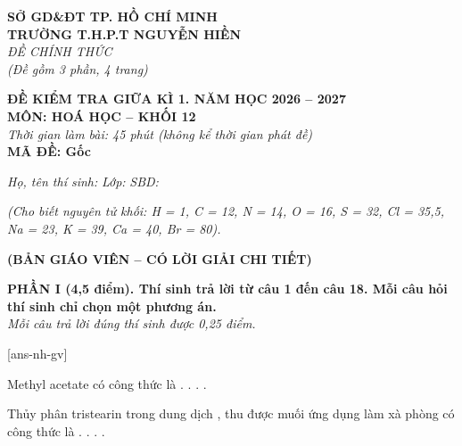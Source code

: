 \documentclass[11pt,a4paper]{article}
\begin{document}
\begin{minipage}[t]{0.45\textwidth}
\textbf{SỞ GD\&ĐT TP. HỒ CHÍ MINH}\\
\textbf{TRƯỜNG T.H.P.T NGUYỄN HIỀN}\\
\textit{ĐỀ CHÍNH THỨC}\\
\textit{(Đề gồm 3 phần, 4 trang)}
\end{minipage}
\hfill
\begin{minipage}[t]{0.52\textwidth}
\raggedleft
\textbf{\color{hfRed}ĐỀ KIỂM TRA GIỮA KÌ 1. NĂM HỌC 2026 -- 2027}\\
\textbf{MÔN: HOÁ HỌC -- KHỐI 12}\\
\textit{Thời gian làm bài: 45 phút (không kể thời gian phát đề)}\\
\textbf{MÃ ĐỀ: Gốc}
\end{minipage}

\vspace{3pt}
\noindent
\textit{Họ, tên thí sinh:} \dotfill \textit{Lớp:} \dotfill \textit{SBD:} \dotfill

\vspace{2pt}
\noindent
\textit{\footnotesize (Cho biết nguyên tử khối: H = 1, C = 12, N = 14, O = 16, S = 32, Cl = 35,5, Na = 23, K = 39, Ca = 40, Br = 80).}

\vspace{2pt}
\begin{center}
\textbf{\color{hfRed}\large (BẢN GIÁO VIÊN -- CÓ LỜI GIẢI CHI TIẾT)}
\end{center}

\vspace{2pt}
\noindent
\textbf{\color{mainGreen}PHẦN I (4,5 điểm). Thí sinh trả lời từ câu 1 đến câu 18. Mỗi câu hỏi thí sinh chỉ chọn một phương án.}\\
\textit{Mỗi câu trả lời đúng thí sinh được 0,25 điểm.}

[ans-nh-gv]

\begin{ex}
Methyl acetate có công thức là
\choice
{.}
{\True {}.}
{.}
{.}
\end{ex}

\begin{ex}
Thủy phân tristearin  trong dung dịch , thu được muối ứng dụng làm xà phòng có công thức là
\choice
{.}
{\True {}.}
{.}
{.}
\end{ex}
\end{document}
